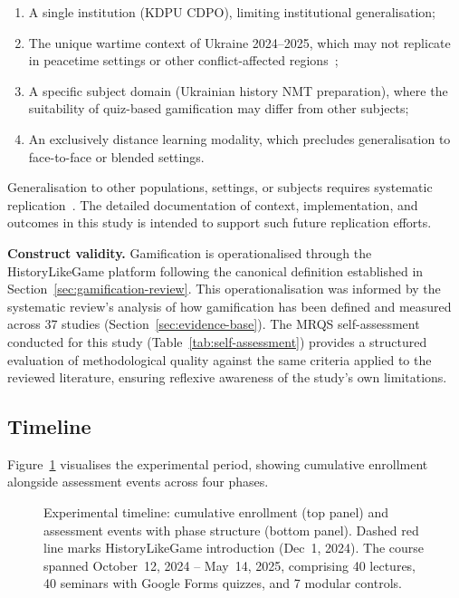 \begin{enumerate}
\item A single institution (KDPU CDPO), limiting institutional generalisation;
\item The unique wartime context of Ukraine 2024--2025, which may not replicate in peacetime settings or other conflict-affected regions~\cite{Burde2017, Kirk2007};
\item A specific subject domain (Ukrainian history NMT preparation), where the suitability of quiz-based gamification may differ from other subjects;
\item An exclusively distance learning modality, which precludes generalisation to face-to-face or blended settings.
\end{enumerate}

\noindent Generalisation to other populations, settings, or subjects requires systematic replication~\cite{CampbellStanley1963, ShadishCookCampbell2002}. The detailed documentation of context, implementation, and outcomes in this study is intended to support such future replication efforts.

\textbf{Construct validity.} Gamification is operationalised through the HistoryLikeGame platform following the canonical definition established in Section~\ref{sec:gamification-review}. This operationalisation was informed by the systematic review's analysis of how gamification has been defined and measured across 37 studies (Section~\ref{sec:evidence-base}). The MRQS self-assessment conducted for this study (Table~\ref{tab:self-assessment}) provides a structured evaluation of methodological quality against the same criteria applied to the reviewed literature, ensuring reflexive awareness of the study's own limitations.

\subsection{Timeline}

Figure~\ref{fig:experimental-timeline} visualises the experimental period, showing cumulative enrollment alongside assessment events across four phases.

\begin{figure}[!h]
\centering

\caption{Experimental timeline: cumulative enrollment (top panel) and assessment events with phase structure (bottom panel). Dashed red line marks HistoryLikeGame introduction (Dec~1, 2024). The course spanned October~12, 2024 -- May~14, 2025, comprising 40 lectures, 40 seminars with Google Forms quizzes, and 7 modular controls.}
\label{fig:experimental-timeline}
\end{figure}

